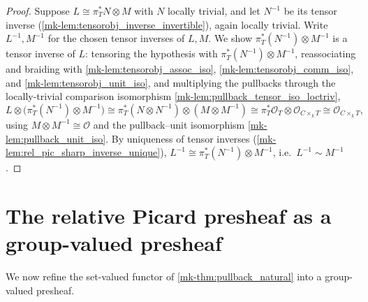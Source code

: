 \begin{proof}
  \leanok
  Suppose \(L \cong \pi_T^* N \otimes M\) with \(N\) locally trivial, and let
  \(N^{-1}\) be its tensor inverse (\ref{mk-lem:tensorobj_inverse_invertible}),
  again locally trivial. Write \(L^{-1}, M^{-1}\) for the chosen tensor inverses
  of \(L, M\). We show \(\pi_T^*(N^{-1}) \otimes M^{-1}\) is a tensor inverse of
  \(L\): tensoring the hypothesis with \(\pi_T^*(N^{-1}) \otimes M^{-1}\),
  reassociating and braiding with
  \ref{mk-lem:tensorobj_assoc_iso}, \ref{mk-lem:tensorobj_comm_iso}, and
  \ref{mk-lem:tensorobj_unit_iso},
  and multiplying the pullbacks through the locally-trivial comparison
  isomorphism \ref{mk-lem:pullback_tensor_iso_loctriv},
  \[
    L \otimes \bigl(\pi_T^*(N^{-1}) \otimes M^{-1}\bigr)
      \cong \pi_T^*(N \otimes N^{-1}) \otimes (M \otimes M^{-1})
      \cong \pi_T^* \mathcal{O}_T \otimes \mathcal{O}_{C \times_k T}
      \cong \mathcal{O}_{C \times_k T} ,
  \]
  using \(M \otimes M^{-1} \cong \mathcal{O}\) and the pullback--unit
  isomorphism \ref{mk-lem:pullback_unit_iso}. By uniqueness of tensor inverses
  (\ref{mk-lem:rel_pic_sharp_inverse_unique}),
  \(L^{-1} \cong \pi_T^*(N^{-1}) \otimes M^{-1}\), i.e.\ \(L^{-1} \sim M^{-1}\).
\end{proof}

\section{The relative Picard presheaf as a group-valued presheaf}
\label{mk-sec:relpic_groupvalued}

We now refine the set-valued functor of \ref{mk-thm:pullback_natural} into a
group-valued presheaf.

